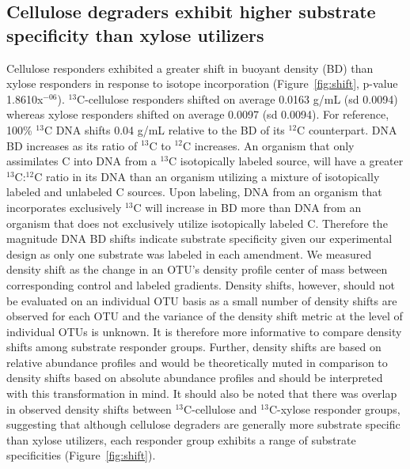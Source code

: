 \subsection{Cellulose degraders exhibit higher substrate specificity than xylose
utilizers} 
Cellulose responders exhibited a greater shift in buoyant density (BD) than xylose
responders in response to isotope incorporation (Figure~\ref{fig:shift},
p-value 1.8610x$^{-06}$). $^{13}$C-cellulose responders shifted on average 0.0163
g/mL (sd 0.0094) whereas xylose responders shifted on average 0.0097 (sd
0.0094). For reference, 100\% $^{13}$C DNA shifts 0.04 g/mL relative to the BD
of its $^{12}$C counterpart. DNA BD increases as its ratio of $^{13}$C to
$^{12}$C increases. An organism that only assimilates C into DNA from a
$^{13}$C isotopically labeled source, will have a greater $^{13}$C:$^{12}$C
ratio in its DNA than an organism utilizing a mixture of isotopically labeled
and unlabeled C sources. Upon labeling, DNA from an organism that incorporates
exclusively $^{13}$C will increase in BD more than DNA from an
organism that does not exclusively utilize isotopically labeled C. Therefore
the magnitude DNA BD shifts indicate substrate specificity given
our experimental design as only one substrate was labeled in each amendment. We
measured density shift as the change in an OTU's density profile center of mass
between corresponding control and labeled gradients. Density shifts, however,
should not be evaluated on an individual OTU basis as a small number of density
shifts are observed for each OTU and the variance of the density shift metric
at the level of individual OTUs is unknown. It is therefore more informative to
compare density shifts among substrate responder groups. Further, density
shifts are based on relative abundance profiles and would be theoretically
muted in comparison to density shifts based on absolute abundance profiles and
should be interpreted with this transformation in mind. It should also be noted
that there was overlap in observed density shifts between $^{13}$C-cellulose
and $^{13}$C-xylose responder groups, suggesting that although cellulose
degraders are generally more substrate specific than xylose utilizers, each responder group
exhibits a range of substrate specificities (Figure~\ref{fig:shift}).
